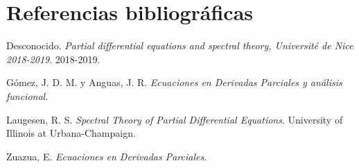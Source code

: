 \documentclass{article}
\begin{document}
\section{Referencias bibliográficas}

\begin{thebibliography}{9}

    Desconocido. \emph{Partial differential equations and spectral theory, Université de Nice 2018-2019}. 2018-2019.
    
    Gómez, J. D. M. y Anguas, J. R. \emph{Ecuaciones en Derivadas Parciales y análisis funcional}.
    
    Laugesen, R. S. \emph{Spectral Theory of Partial Differential Equations}. University of Illinois at Urbana-Champaign.
    
    Zuazua, E. \emph{Ecuaciones en Derivadas Parciales}.
    
    \end{thebibliography}
    
\end{document}
